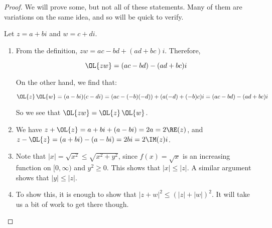 \begin{proof} We will prove some, but not all of these statements. Many of them are variations on the same idea, and so will be quick to verify.

Let $z = a+ bi$ and $w = c + di$.

\begin{enumerate}
\item From the definition, $zw = ac -bd + (ad + bc)i$. Therefore, 

$$\OL{zw} = (ac - bd) - (ad + bc)i$$

On the other hand, we find that:

$$\OL{z}\,\OL{w} = (a-bi)(c-di) = (ac - (-b)(-d)) + (a(-d) + (-b)c)i = (ac - bd) - (ad +bc)i$$

So we see that $\OL{zw} = \OL{z}\,\OL{w}$.

\setcounter{enumi}{3}

\item We have $z + \OL{z} = a + bi + (a-bi) = 2a = 2\RE(z)$, and $z - \OL{z} = (a + bi) - (a-bi) = 2bi = 2\IM(z)i$.

\setcounter{enumi}{7}

\item  Note that $|x| = \sqrt{x^2} \le \sqrt{x^2 + y^2}$, since $f(x) =\sqrt{x}$ is an increasing function on $[0,\infty)$ and $y^2\ge 0$. This shows that $|x| \le |z|$. A similar argument shows that $|y| \le |z|$.

\item To show this, it is enough to show that $|z+w|^2 \le (|z| + |w|)^2$. It will take us a bit of work to get there though.

%
%
%
%
%
%
%
%
%
%
%
%
%





\end{enumerate}
\end{proof}
